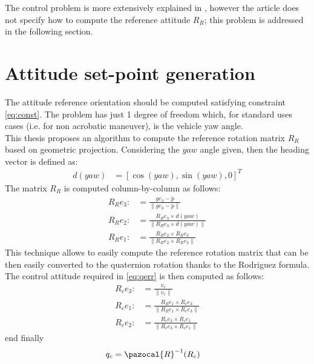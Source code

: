 The control problem is more extensively explained in \autocite{marconi}, however the article does not specify how to compute the reference attitude $R_{R}$; this problem is addressed in the following section.


\section{Attitude set-point generation} \label{se:attSP}
The attitude reference orientation should be computed satisfying constraint \ref{eq:const}. The problem has just 1 degree of freedom which, for standard uses cases (i.e. for non acrobatic maneuver), is the vehicle yaw angle.\\
This thesis proposes an algorithm to compute the reference rotation matrix $R_{R}$ based on geometric projection. Considering the $yaw$ angle given, then the heading vector is defined as:
\begin{equation}
\begin{split}
d(yaw) &= [\cos{(yaw)} , \sin{(yaw)} , 0]^{T}
\end{split}
\end{equation}
The matrix $R_{R}$ is computed column-by-column as follows:
\begin{equation}
\begin{split}
R_{R}e_{3} :&= \frac{g e_{3} - \ddot{p}}{\lVert g e_{3} - \ddot{p} \rVert}\\
R_{R}e_{2} :&= \frac{R_{R}e_{3} \times d(yaw)}{\lVert R_{R}e_{3} \times d(yaw)  \rVert}\\
R_{R}e_{1} :&= \frac{R_{R}e_{2} \times R_{R}e_{3}}{\lVert R_{R}e_{2} \times R_{R}e_{3} \rVert}
\end{split}
\end{equation}
This technique allows to easily compute the reference rotation matrix that can be then easily converted to the quaternion rotation thanks to the Rodriguez formula.
The control attitude required in \autoref{eq:qerr} is then computed as follows:
\begin{equation}
\begin{split}
R_{c}e_{3} :&= \frac{v_{c} }{\lVert v_{c}  \rVert} \\
R_{c}e_{1} :&= \frac{R_{R}e_{1} \times R_{c}e_{3}}{\lVert R_{R}e_{1} \times R_{c}e_{3} \rVert}  \\
R_{c}e_{2} :&= \frac{R_{c}e_{3} \times R_{c}e_{1}}{\lVert R_{c}e_{3} \times R_{c}e_{1} \rVert}  
\end{split}
\end{equation}
end finally
\begin{equation}
\begin{split}
q_{c} &= \pazocal{R}^{-1}(R_{c})
\end{split}
\end{equation}
